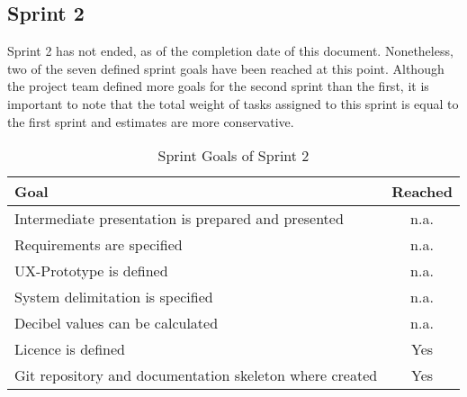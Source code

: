 \subsection{Sprint 2}\label{subsec:sprint-2}
Sprint 2 has not ended, as of the completion date of this document.
Nonetheless, two of the seven defined sprint goals have been reached at this point.
Although the project team defined more goals for the second sprint than the first, it is important to note that the total weight of tasks assigned to this
sprint is equal to the first sprint and estimates are more conservative.
\begin{table}[H]
    \centering
    \begin{tabularx}{\textwidth}{X c}
        \toprule
        \textbf{Goal}                                         & \textbf{Reached} \\
        \midrule
        Intermediate presentation is prepared and presented   & n.a.             \\
        \midrule
        Requirements are specified                            & n.a.             \\
        \midrule
        UX-Prototype is defined                               & n.a.             \\
        \midrule
        System delimitation is specified                      & n.a.             \\
        \midrule
        Decibel values can be calculated                      & n.a.             \\
        \midrule
        Licence is defined                                    & Yes              \\
        \midrule
        Git repository and documentation skeleton where created & Yes              \\
        \bottomrule
    \end{tabularx}
    \caption{Sprint Goals of Sprint 2}\label{table:sprint_goals2}
\end{table}